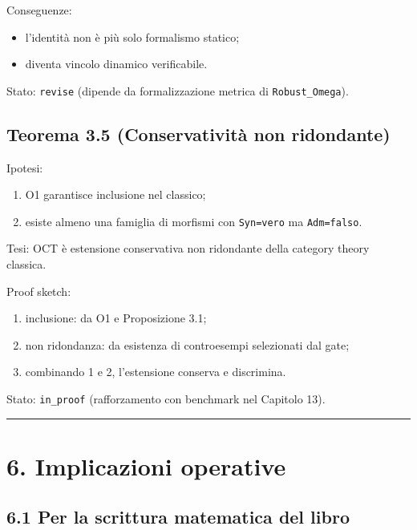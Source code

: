 Conseguenze:

\begin{itemize}
\tightlist
\item
  l'identità non è più solo formalismo statico;
\item
  diventa vincolo dinamico verificabile.
\end{itemize}

Stato: \texttt{revise} (dipende da formalizzazione metrica di \texttt{Robust\_Omega}).

\subsection{Teorema 3.5 (Conservatività non ridondante)}

Ipotesi:

\begin{enumerate}
\def\labelenumi{\arabic{enumi}.}
\tightlist
\item
  O1 garantisce inclusione nel classico;
\item
  esiste almeno una famiglia di morfismi con \texttt{Syn=vero} ma \texttt{Adm=falso}.
\end{enumerate}

Tesi:
OCT è estensione conservativa non ridondante della category theory classica.

Proof sketch:

\begin{enumerate}
\def\labelenumi{\arabic{enumi}.}
\tightlist
\item
  inclusione: da O1 e Proposizione 3.1;
\item
  non ridondanza: da esistenza di controesempi selezionati dal gate;
\item
  combinando 1 e 2, l'estensione conserva e discrimina.
\end{enumerate}

Stato: \texttt{in\_proof} (rafforzamento con benchmark nel Capitolo 13).

\begin{center}\rule{0.5\linewidth}{0.5pt}\end{center}

\section{6. Implicazioni operative}

\subsection{6.1 Per la scrittura matematica del libro}

